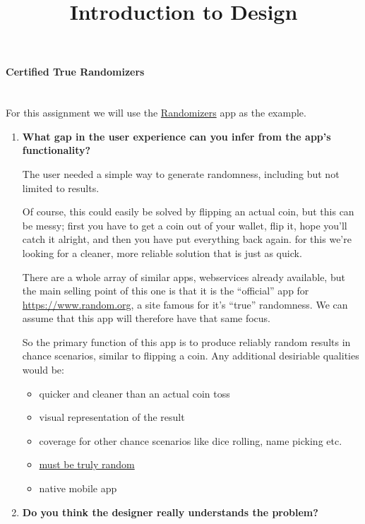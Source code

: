 \title{Introduction to Design}

\paragraph{Certified True Randomizers} \hspace{0pt} \\


For this assignment we will use the \href{https://www.random.org/app/}{Randomizers} app as the example.


\begin{enumerate}
  \item \textbf{What gap in the user experience can you infer from the app’s functionality?}

    The user needed a simple way to generate randomness, including but not limited to  results.

    Of course, this could easily be solved by flipping an actual coin, but this can be messy;
    first you have to get a coin out of your wallet, flip it, hope you'll catch it alright, and then you have put everything back again.
    for this we're looking for a cleaner, more reliable solution that is just as quick.

    There are a whole array of similar apps, webservices already available, but the main selling point of this one is that it is the ``official'' app
    for \url{https://www.random.org}, a site famous for it's ``true'' randomness. We can assume that this app will therefore have that same focus.

    So the primary function of this app is to produce reliably random results in  chance scenarios, similar to flipping a coin.
    Any additional desiriable qualities would be:

    \begin{itemize}
      \item quicker and cleaner than an actual coin toss
      \item visual representation of the result
      \item coverage for other chance scenarios like dice rolling, name picking etc.
      \item \href{https://www.xkcd.com/221/}{must be truly random}
      \item native mobile app
    \end{itemize}

  \item \textbf{Do you think the designer really understands the problem?}


\end{enumerate}
